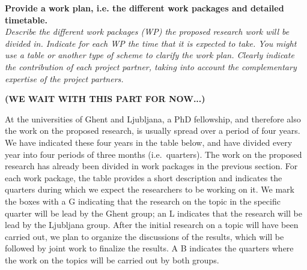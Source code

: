 \documentclass[11pt,dvipsnames,usenames,a4paper]{article}
\begin{document}
%

\vspace{7pt}

\textbf{Provide a work plan, i.e. the different work packages and detailed timetable.}\\
\textit{Describe the different work packages (WP) the proposed research work will be divided in.
Indicate for each WP the time that it is expected to take.
You might use a table or another type of scheme to clarify the work plan. Clearly indicate the contribution of each project partner, taking into account the complementary expertise of the project partners.}


{\bf\color{blue} (WE WAIT WITH THIS PART FOR NOW...)}


At the universities of Ghent and Ljubljana, a PhD fellowship, and therefore also the work on the proposed research, is usually spread over a period of four years.
We have indicated these four years in the table below, and have divided every year into four periods of three months (i.e.~quarters).
The work on the proposed research has already been divided in work packages in the previous section.
For each work package, the table provides a short description and indicates the quarters during which we expect the researchers to be working on it.
We mark the boxes with a G indicating that the research on the topic in the specific quarter will be lead by the Ghent group; an L indicates that the research will be lead by the Ljubljana group. After the initial research on a topic will have been carried out, we plan to organize the discussions of the results, which will be followed by joint work to finalize the results. A B indicates the quarters where the work on the topics will be carried out by both groups. 
\end{document}
